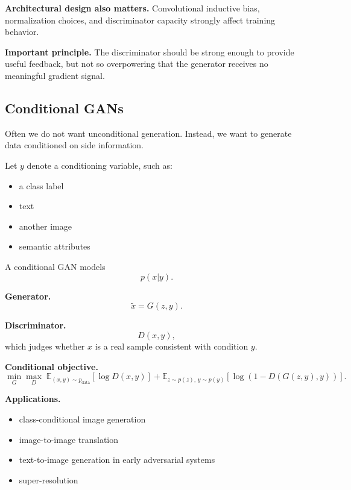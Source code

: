 \medskip

\noindent
\textbf{Architectural design also matters.}
Convolutional inductive bias, normalization choices, and discriminator capacity strongly affect training behavior.

\medskip

\noindent
\textbf{Important principle.}
The discriminator should be strong enough to provide useful feedback, but not so overpowering that the generator receives no meaningful gradient signal.

\subsection{Conditional GANs}

Often we do not want unconditional generation. Instead, we want to generate data conditioned on side information.

\medskip

\noindent
Let $y$ denote a conditioning variable, such as:
\begin{itemize}
    \item a class label
    \item text
    \item another image
    \item semantic attributes
\end{itemize}

\medskip

\noindent
A conditional GAN models
\[
p(x|y).
\]

\medskip

\noindent
\textbf{Generator.}
\[
\tilde{x}=G(z,y).
\]

\medskip

\noindent
\textbf{Discriminator.}
\[
D(x,y),
\]
which judges whether $x$ is a real sample consistent with condition $y$.

\medskip

\noindent
\textbf{Conditional objective.}
\[
\min_G \max_D
\;
\mathbb{E}_{(x,y)\sim p_{\text{data}}}[\log D(x,y)]
+
\mathbb{E}_{z\sim p(z),\, y\sim p(y)}[\log(1-D(G(z,y),y))].
\]

\medskip

\noindent
\textbf{Applications.}
\begin{itemize}
    \item class-conditional image generation
    \item image-to-image translation
    \item text-to-image generation in early adversarial systems
    \item super-resolution
\end{itemize}

